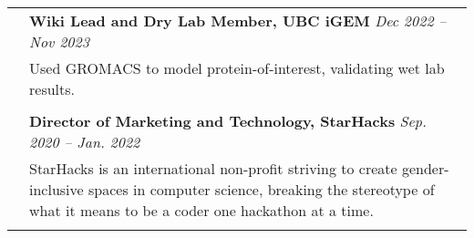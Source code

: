 \documentclass[letterpaper, 11pt]{article}
\begin{document}
\begin{longtable}{p{1.3in}p{4.8in}}
	 & \textbf{Wiki Lead and Dry Lab Member, UBC iGEM} \hfill \textit{Dec 2022 -- Nov 2023}                                                                                                                                                                                                                                                                                                      \\
	 &  Used GROMACS to model protein-of-interest, validating wet lab results.                                                                                                                                                                                                                 \\
	 &                                                                                                                                                                                                                                                                                                                                                                                           \\

	 & \textbf{Director of Marketing and Technology, StarHacks} \hfill \textit{Sep. 2020 -- Jan. 2022}                                                                                                                                                                                                                                                                                           \\
	 & StarHacks is an international non-profit striving to create gender-inclusive spaces in computer science, breaking the stereotype of what it means to be a coder one hackathon at a time.                                                                                                                                                                                                  \\
	 &                                                                                                                                                                                                                                                                                                                                                                                           \\


\end{longtable}
\end{document}
